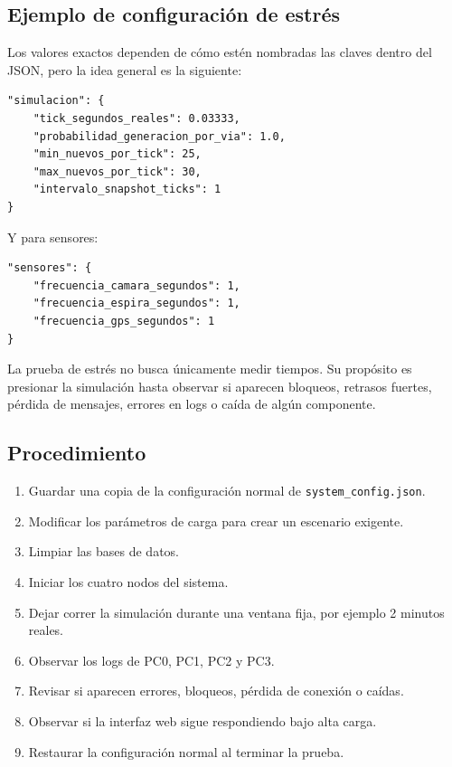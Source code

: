 \documentclass[12pt, a4paper]{article}
\begin{document}
\subsection{Ejemplo de configuración de estrés}

Los valores exactos dependen de cómo estén nombradas las claves dentro del JSON, pero la idea general es la siguiente:

\begin{verbatim}
"simulacion": {
    "tick_segundos_reales": 0.03333,
    "probabilidad_generacion_por_via": 1.0,
    "min_nuevos_por_tick": 25,
    "max_nuevos_por_tick": 30,
    "intervalo_snapshot_ticks": 1
}
\end{verbatim}

Y para sensores:

\begin{verbatim}
"sensores": {
    "frecuencia_camara_segundos": 1,
    "frecuencia_espira_segundos": 1,
    "frecuencia_gps_segundos": 1
}
\end{verbatim}

\begin{notabox}
La prueba de estrés no busca únicamente medir tiempos. Su propósito es presionar la simulación hasta observar si aparecen bloqueos, retrasos fuertes, pérdida de mensajes, errores en logs o caída de algún componente.
\end{notabox}

\subsection{Procedimiento}

\begin{enumerate}
    \item Guardar una copia de la configuración normal de \texttt{system\_config.json}.
    \item Modificar los parámetros de carga para crear un escenario exigente.
    \item Limpiar las bases de datos.
    \item Iniciar los cuatro nodos del sistema.
    \item Dejar correr la simulación durante una ventana fija, por ejemplo 2 minutos reales.
    \item Observar los logs de PC0, PC1, PC2 y PC3.
    \item Revisar si aparecen errores, bloqueos, pérdida de conexión o caídas.
    \item Observar si la interfaz web sigue respondiendo bajo alta carga.
    \item Restaurar la configuración normal al terminar la prueba.
\end{enumerate}
\end{document}
